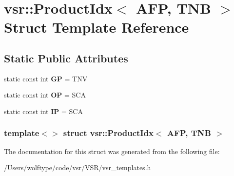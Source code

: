 \hypertarget{structvsr_1_1_product_idx_3_01_a_f_p_00_01_t_n_b_01_4}{\section{vsr\-:\-:Product\-Idx$<$ A\-F\-P, T\-N\-B $>$ Struct Template Reference}
\label{structvsr_1_1_product_idx_3_01_a_f_p_00_01_t_n_b_01_4}
}
\subsection*{Static Public Attributes}
\begin{DoxyCompactItemize}
\item 
\hypertarget{structvsr_1_1_product_idx_3_01_a_f_p_00_01_t_n_b_01_4_aa16f2451ee4412ca631f752618d7c680}{static const int {\bfseries G\-P} = T\-N\-V}\label{structvsr_1_1_product_idx_3_01_a_f_p_00_01_t_n_b_01_4_aa16f2451ee4412ca631f752618d7c680}

\item 
\hypertarget{structvsr_1_1_product_idx_3_01_a_f_p_00_01_t_n_b_01_4_ac495f6261263d7dc6c4970588bb01c23}{static const int {\bfseries O\-P} = S\-C\-A}\label{structvsr_1_1_product_idx_3_01_a_f_p_00_01_t_n_b_01_4_ac495f6261263d7dc6c4970588bb01c23}

\item 
\hypertarget{structvsr_1_1_product_idx_3_01_a_f_p_00_01_t_n_b_01_4_ab5049a41742fd905c440c1c40d553e06}{static const int {\bfseries I\-P} = S\-C\-A}\label{structvsr_1_1_product_idx_3_01_a_f_p_00_01_t_n_b_01_4_ab5049a41742fd905c440c1c40d553e06}

\end{DoxyCompactItemize}
\subsubsection*{template$<$$>$ struct vsr\-::\-Product\-Idx$<$ A\-F\-P, T\-N\-B $>$}



The documentation for this struct was generated from the following file\-:\begin{DoxyCompactItemize}
\item 
/\-Users/wolftype/code/vsr/\-V\-S\-R/vsr\-\_\-templates.\-h\end{DoxyCompactItemize}
